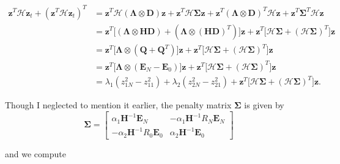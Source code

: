 \documentclass[12pt]{article}
\begin{document}
\begin{flushleft}
\begin{align*}
\mathbf{z}^{T} \mathcal{H} \mathbf{z}_t + (\mathbf{z}^{T}\mathcal{H} \mathbf{z}_t)^{T} &= \mathbf{z}^{T}\mathcal{H} (\boldsymbol{\Lambda} \otimes \boldsymbol{D} ) \mathbf{z} + \mathbf{z}^{T} \mathcal{H} \boldsymbol{\Sigma} \boldsymbol{z}
+ \mathbf{z}^{T} (\boldsymbol{\Lambda} \otimes \boldsymbol{D} )^{T}\mathcal{H} \mathbf{z} + \mathbf{z}^{T} \boldsymbol{\Sigma}^{T}\mathcal{H} \boldsymbol{z}\\
&=\mathbf{z}^{T} \big [( \boldsymbol{\Lambda} \otimes \boldsymbol{H D}) + (\boldsymbol{\Lambda} \otimes (\boldsymbol{HD})^{T}) \big ] \mathbf{z} + \mathbf{z}^{T} \big [ \mathcal{H}\boldsymbol{\Sigma} +(\mathcal{H}\boldsymbol{\Sigma})^{T} \big ] \mathbf{z}\\
&= \mathbf{z}^{T} \big [ \boldsymbol{\Lambda} \otimes (\boldsymbol{Q} +\boldsymbol{Q}^{T}) \big ] \mathbf{z} + \mathbf{z}^{T} \big [ \mathcal{H}\boldsymbol{\Sigma} +(\mathcal{H}\boldsymbol{\Sigma})^{T} \big ] \mathbf{z}\\
&= \mathbf{z}^{T} \big [ \boldsymbol{\Lambda} \otimes (\boldsymbol{E}_N - \boldsymbol{E}_0) \big ] \mathbf{z} + \mathbf{z}^{T} \big [ \mathcal{H}\boldsymbol{\Sigma} +(\mathcal{H}\boldsymbol{\Sigma})^{T} \big ] \mathbf{z} \\
&= \lambda_1( z_{1N}^2 - z_{11}^2) + \lambda_2(z_{2N}^2 - z_{21}^2) + \mathbf{z}^{T} \big [ \mathcal{H}\boldsymbol{\Sigma} +(\mathcal{H}\boldsymbol{\Sigma})^{T} \big ] \mathbf{z}.
\end{align*}

Though I neglected to mention it earlier, the penalty matrix $\boldsymbol{\Sigma}$ is given by
$$\boldsymbol{\Sigma} = \begin{bmatrix}
\alpha_1 \boldsymbol{H}^{-1} \boldsymbol{E}_N & -\alpha_1 \boldsymbol{H}^{-1} R_N \boldsymbol{E}_N \\
-\alpha_2 \boldsymbol{H}^{-1} R_0 \boldsymbol{E}_0 & \alpha_2\boldsymbol{H}^{-1} \boldsymbol{E}_0
\end{bmatrix}$$

and we compute


\end{flushleft}
\end{document}
